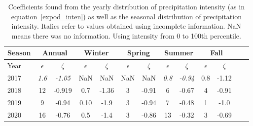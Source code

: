 \begin{table}[htb]
  \begin{center}
    \begin{tabular}{|l|*{11}{c|}r|}
      \hline
      Season    &       \multicolumn{2}{|c|}{Annual}          & \multicolumn{2}{|c|}{Winter}& \multicolumn{2}{|c|}{Spring}  & \multicolumn{2}{|c|}{Summer} &\multicolumn{2}{|c|}{Fall}  \\
      \hline
      Year      & $\epsilon $ & $\zeta$  &  $\epsilon $ & $\zeta$  &  $\epsilon $ & $\zeta$  &  $\epsilon $ & $\zeta$  & $\epsilon $ & $\zeta$ \\
      \hline
      2017      & \textit{1.6}  & \textit{-1.05}  & NaN & NaN & NaN & NaN & \textit{0.8}  & \textit{-0.94}  & 0.8  & -1.12 \\
      2018      & 12           & -0.919  & 0.7 & -1.36 & 3 & -0.91  & 6  & -0.67  & 4 & -0.91  \\
      2019      & 9           & -0.94  & 0.10 & -1.9 & 3 & -0.94 & 7 & -0.48 & 1 & -1.0  \\
      2020      & 16          & -0.76  & 0.5 & -1.4 & 3 & -0.86 & 13  & -0.32 & 3 & -0.69\\
      \hline
    \end{tabular}
  \end{center}
  \caption[Year comparison of coefficients for precipitation intensity up to
    100 percentile] {\label{fourthtable_100}Coefficients found from the
    yearly distribution of precipitation intensity (as in
    equation~\ref{expod_inten}) as well as the seasonal distribution of
    precipitation intensity. Italics refer to values obtained using
    incomplete information. NaN means there was no information. Using
    intensity from 0 to 100th percentile. }
\end{table}

